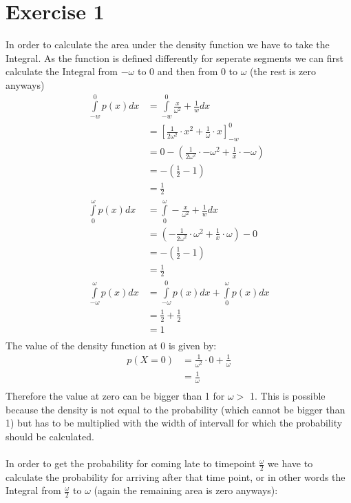 \def \TutorialSheetNumber{4}

\section*{Exercise 1}
In order to calculate the area under the density function we have to take the Integral. As the function is defined differently for seperate segments we can first calculate the Integral from $-\omega$ to 0 and then from 0 to $\omega$ (the rest is zero anyways)
\begin{align*}
\int \limits_{-w}^{0}p(x) dx & = \int \limits_{-w}^{0} \frac{x}{\omega^2} + \frac{1}{w} dx \\
& = [\frac{1}{2\omega ^2} \cdot x^2 + \frac{1}{\omega } \cdot x]_{-w}^{0} \\
& = 0 - (\frac{1}{2\omega ^2} \cdot -\omega^2 + \frac{1}{x} \cdot -\omega) \\
& = -(\frac{1}{2} - 1) \\
& = \frac{1}{2}\\
\int \limits_{0}^{\omega}p(x) dx & = \int \limits_{0}^{\omega} -\frac{x}{\omega^2} + \frac{1}{w} dx \\
& = (-\frac{1}{2\omega ^2} \cdot \omega^2 + \frac{1}{x} \cdot \omega) - 0 \\
& = -(\frac{1}{2} - 1) \\
& = \frac{1}{2}\\
\int \limits_{-\omega}^{\omega}p(x) dx & = \int \limits_{-\omega}^{0}p(x) dx +\int \limits_{0}^{\omega}p(x) dx \\
& = \frac{1}{2} + \frac{1}{2} \\
& = 1\\
\end{align*}
The value of the density function at 0 is given by:\\
\begin{align*}
  p(X=0) & = \frac{1}{\omega^2} \cdot 0 + \frac{1}{\omega} \\
  & = \frac{1}{\omega}\\
\end{align*}
Therefore the value at zero can be bigger than 1 for $\omega >$ 1. This is possible because the density is not equal to the probability (which cannot be bigger than 1) but has to be multiplied with the width of intervall for which the probability should be calculated.
\\
\\
In order to get the probability for coming late to timepoint $\frac{\omega}{2}$ we have to calculate the probability for arriving after that time point, or in other words the Integral from $\frac{\omega}{2}$ to $\omega$ (again the remaining area is zero anyways):\\
